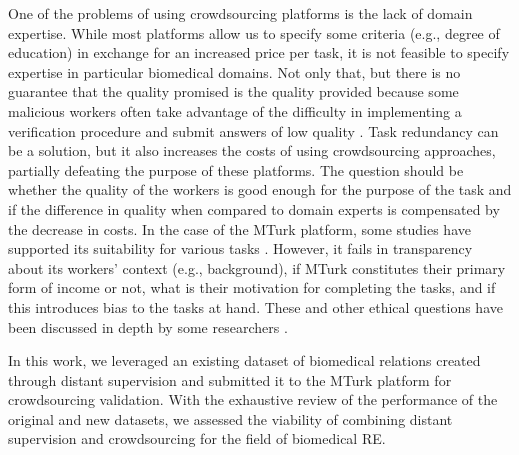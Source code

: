 One of the problems of using crowdsourcing platforms is the lack of domain expertise. While most platforms allow us to specify some criteria (e.g., degree of education) in exchange for an increased price per task, it is not feasible to specify expertise in particular biomedical domains. Not only that, but there is no guarantee that the quality promised is the quality provided because some malicious workers often take advantage of the difficulty in implementing a verification procedure and submit answers of low quality \citep{callison2010creating}. Task redundancy can be a solution, but it also increases the costs of using crowdsourcing approaches, partially defeating the purpose of these platforms. The question should be whether the quality of the workers is good enough for the purpose of the task and if the difference in quality when compared to domain experts is compensated by the decrease in costs. In the case of the MTurk platform, some studies have supported its suitability for various tasks \citep{mortensen2018comparing}. However, it fails in transparency about its workers' context (e.g., background), if MTurk constitutes their primary form of income or not, what is their motivation for completing the tasks, and if this introduces bias to the tasks at hand. These and other ethical questions have been discussed in depth by some researchers \citep{fort2011amazon,paolacci2014inside}.

In this work, we leveraged an existing dataset of biomedical relations created through distant supervision and submitted it to the MTurk platform for crowdsourcing validation. With the exhaustive review of the performance of the original and new datasets, we assessed the viability of combining distant supervision and crowdsourcing for the field of biomedical RE. 

